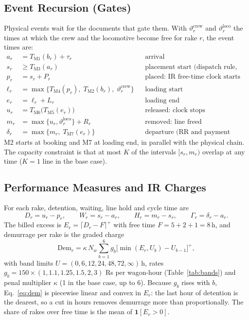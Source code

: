 \subsection{Event Recursion (Gates)}
Physical events wait for the documents that gate them. With $\vartheta^{\text{crew}}_r$ and $\vartheta^{\text{loco}}_r$ the times at which the crew and the locomotive become free for rake $r$, the event times are:
\begin{equation}
\begin{aligned}
a_r &= T_{\mathrm{M1}}(b_r) + \tau_r && \text{arrival}\\
s_r &\ge T_{\mathrm{M3}}(a_r) && \text{placement start (dispatch rule, line and loco free)}\\
p_r &= s_r + P_r && \text{placed: IR free-time clock starts}\\
\ell_r &= \max\{T_{\mathrm{M4}}(p_r),\; T_{\mathrm{M2}}(b_r),\; \vartheta^{\text{crew}}_r\} && \text{loading start}\\
e_r &= \ell_r + L_r && \text{loading end}\\
u_r &= T_{\mathrm{M6}}\big(T_{\mathrm{M5}}(e_r)\big) && \text{released: clock stops}\\
m_r &= \max\{u_r, \vartheta^{\text{loco}}_r\} + R_r && \text{removed: line freed}\\
\delta_r &= \max\{m_r,\; T_{\mathrm{M7}}(e_r)\} && \text{departure (RR and payment done)}
\end{aligned}
\label{eq:chain}
\end{equation}
M2 starts at booking and M7 at loading end, in parallel with the physical chain. The capacity constraint is that at most $K$ of the intervals $[s_r, m_r)$ overlap at any time ($K = 1$ line in the base case).

\subsection{Performance Measures and IR Charges}
For each rake, detention, waiting, line hold and cycle time are
\begin{equation}
D_r = u_r - p_r, \qquad W_r = s_r - a_r, \qquad H_r = m_r - s_r, \qquad \Gamma_r = \delta_r - a_r .
\label{eq:kpi}
\end{equation}
The billed excess is $E_r = \lceil D_r - F \rceil^{+}$ with free time $F = 5 + 2 + 1 = 8$\,h, and demurrage per rake is the graded charge \cite{ircomp}
\begin{equation}
\mathrm{Dem}_r = \kappa\, N_w \sum_{b=1}^{6} g_b \big[\min(E_r, U_b) - U_{b-1}\big]^{+},
\label{eq:dem}
\end{equation}
with band limits $U = (0, 6, 12, 24, 48, 72, \infty)$\,h, rates $g_b = 150 \times (1, 1.1, 1.25, 1.5, 2, 3)$ Rs per wagon-hour (Table~\ref{tab:bands}) and penal multiplier $\kappa$ (1 in the base case, up to 6). Because $g_b$ rises with $b$, Eq.~\eqref{eq:dem} is piecewise linear and convex in $E_r$: the last hour of detention is the dearest, so a cut in hours removes demurrage more than proportionally. The share of rakes over free time is the mean of $\mathbf{1}[E_r > 0]$.

